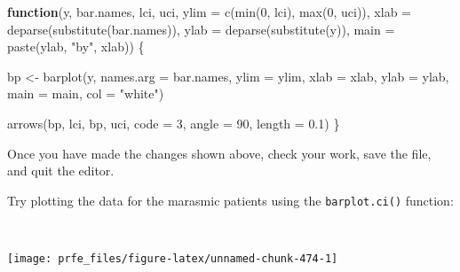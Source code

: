 \documentclass[
  12pt,
  a4paper]{book}
\newenvironment{Shaded}{\begin{snugshade}}{\end{snugshade}}
\newcommand{\AttributeTok}[1]{\textcolor[rgb]{0.77,0.63,0.00}{#1}}
\newcommand{\ControlFlowTok}[1]{\textcolor[rgb]{0.13,0.29,0.53}{\textbf{#1}}}
\newcommand{\DecValTok}[1]{\textcolor[rgb]{0.00,0.00,0.81}{#1}}
\newcommand{\FloatTok}[1]{\textcolor[rgb]{0.00,0.00,0.81}{#1}}
\newcommand{\FunctionTok}[1]{\textcolor[rgb]{0.00,0.00,0.00}{#1}}
\newcommand{\NormalTok}[1]{#1}
\newcommand{\OtherTok}[1]{\textcolor[rgb]{0.56,0.35,0.01}{#1}}
\newcommand{\SpecialCharTok}[1]{\textcolor[rgb]{0.00,0.00,0.00}{#1}}
\newcommand{\StringTok}[1]{\textcolor[rgb]{0.31,0.60,0.02}{#1}}
\begin{document}
\begin{Shaded}
\begin{Highlighting}[]
\ControlFlowTok{function}\NormalTok{(y, bar.names, lci, uci,}
         \AttributeTok{ylim =} \FunctionTok{c}\NormalTok{(}\FunctionTok{min}\NormalTok{(}\DecValTok{0}\NormalTok{, lci), }\FunctionTok{max}\NormalTok{(}\DecValTok{0}\NormalTok{, uci)),}
         \AttributeTok{xlab =} \FunctionTok{deparse}\NormalTok{(}\FunctionTok{substitute}\NormalTok{(bar.names)),}
         \AttributeTok{ylab =} \FunctionTok{deparse}\NormalTok{(}\FunctionTok{substitute}\NormalTok{(y)),}
         \AttributeTok{main =} \FunctionTok{paste}\NormalTok{(ylab, }\StringTok{"by"}\NormalTok{, xlab)) \{}

\NormalTok{  bp }\OtherTok{\textless{}{-}} \FunctionTok{barplot}\NormalTok{(y, }\AttributeTok{names.arg =}\NormalTok{ bar.names,  }\AttributeTok{ylim =}\NormalTok{ ylim, }\AttributeTok{xlab =}\NormalTok{ xlab,}
                \AttributeTok{ylab =}\NormalTok{ ylab, }\AttributeTok{main =}\NormalTok{ main, }\AttributeTok{col =} \StringTok{"white"}\NormalTok{)}
     
  \FunctionTok{arrows}\NormalTok{(bp, lci, bp, uci, }\AttributeTok{code =} \DecValTok{3}\NormalTok{, }\AttributeTok{angle =} \DecValTok{90}\NormalTok{, }\AttributeTok{length =} \FloatTok{0.1}\NormalTok{)}
\NormalTok{\}}
\end{Highlighting}
\end{Shaded}

\newpage

Once you have made the changes shown above, check your work, save the file, and quit the editor.

Try plotting the data for the marasmic patients using the \texttt{barplot.ci()} function:

~

\begin{Shaded}
\end{Shaded}

\begin{center}\texttt{[image: prfe\_files/figure-latex/unnamed-chunk-474-1]} \end{center}

~
\end{document}
